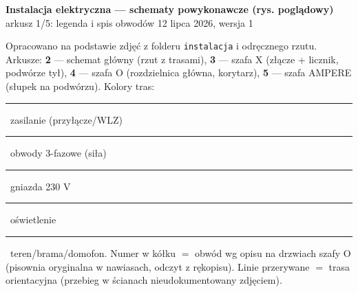 \documentclass[10pt,a4paper,landscape]{article}
\begin{document}
\begin{center}
{\LARGE\bfseries Instalacja elektryczna --- schematy powykonawcze (rys. poglądowy)}\\[2pt]
{\large arkusz 1/5: legenda i spis obwodów \hfill 12 lipca 2026, wersja 1}\\[4pt]
\begin{minipage}{0.94\textwidth}\small
Opracowano na podstawie zdjęć z folderu \texttt{instalacja} i odręcznego rzutu. Arkusze:
\textbf{2} --- schemat główny (rzut z trasami), \textbf{3} --- szafa X (złącze + licznik, podwórze tył),
\textbf{4} --- szafa O (rozdzielnica główna, korytarz), \textbf{5} --- szafa AMPERE (słupek na podwórzu).
Kolory tras: \textcolor{cWLZ}{\rule{18pt}{2.4pt}}~zasilanie (przyłącze/WLZ)\;
\textcolor{c3F}{\rule{18pt}{2.4pt}}~obwody 3-fazowe (siła)\;
\textcolor{cGN}{\rule{18pt}{2.4pt}}~gniazda 230 V\;
\textcolor{cOSW}{\rule{18pt}{2.4pt}}~oświetlenie\;
\textcolor{cSPEC}{\rule{18pt}{2.4pt}}~teren/brama/domofon.
Numer w kółku $=$ obwód wg opisu na drzwiach szafy O (pisownia oryginalna w nawiasach, odczyt z rękopisu).
Linie przerywane $=$ trasa orientacyjna (przebieg w ścianach nieudokumentowany zdjęciem).
\end{minipage}
\end{center}
\vspace{2pt}
\end{document}
